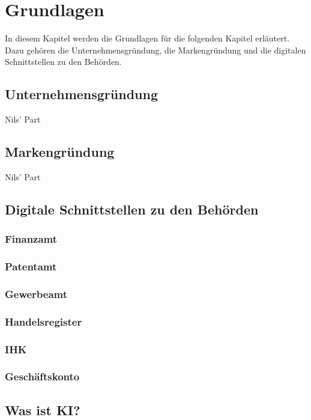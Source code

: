 \newpage

\section{Grundlagen} \label{grundlagen}
In diesem Kapitel werden die Grundlagen für die folgenden Kapitel erläutert. Dazu gehören die Unternehmensgründung, die Markengründung und die digitalen Schnittstellen zu den Behörden.


\subsection{Unternehmensgründung} \label{unternehmensgruendung}

Nils' Part
\subsection{Markengründung} \label{markengruendung}

Nils' Part


\subsection{Digitale Schnittstellen zu den Behörden} \label{digitaleBehoerden}

\subsubsection{Finanzamt} \label{finanzamt}

\subsubsection{Patentamt} \label{patentamt}

\subsubsection{Gewerbeamt} \label{gewerbeamt}

\subsubsection{Handelsregister} \label{handelsregister}

\subsubsection{IHK} \label{ihk}

\subsubsection{Geschäftskonto} \label{geschaeftskonto}


\subsection{Was ist KI?} \label{wasIstKI}

